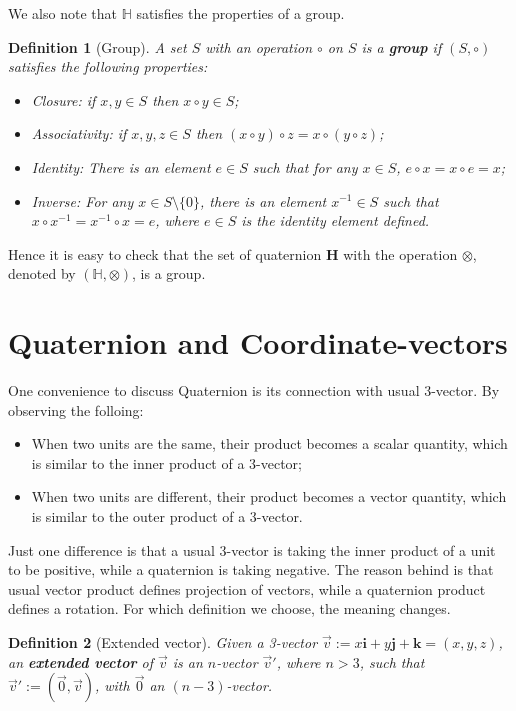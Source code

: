\documentclass[12pt]{article}
\newtheorem*{definition}{Definition}
\begin{document}
    We also note that $\mathbb{H}$ satisfies the properties of a group.

    \begin{definition}[Group]
        A set $S$ with an operation $\circ$ on $S$ is a \textbf{group} if $(S,\circ)$ satisfies the following properties: \begin{itemize}
            \item Closure: if $x,y\in S$ then $x\circ y\in S$;
            \item Associativity: if $x,y,z\in S$ then $(x\circ y)\circ z = x\circ (y\circ z)$;
            \item Identity: There is an element $e\in S$ such that for any $x\in S$, $e\circ x=x\circ e=x$;
            \item Inverse: For any $x\in S\setminus\{0\}$, there is an element $x^{-1}\in S$ such that $x\circ x^{-1}=x^{-1}\circ x= e$, where $e\in S$ is the identity element defined.
        \end{itemize}
    \end{definition}

    Hence it is easy to check that the set of quaternion $\mathbf{H}$ with the operation $\otimes$, denoted by $(\mathbb{H},\otimes)$, is a group.

    \section{Quaternion and Coordinate-vectors}

    One convenience to discuss Quaternion is its connection with usual 3-vector. By observing the folloing: \begin{itemize}
        \item When two units are the same, their product becomes a scalar quantity, which is similar to the inner product of a 3-vector;
        \item When two units are different, their product becomes a vector quantity, which is similar to the outer product of a 3-vector.
    \end{itemize}

    Just one difference is that a usual 3-vector is taking the inner product of a unit to be positive, while a quaternion is taking negative. The reason behind is that usual vector product defines projection of vectors, while a quaternion product defines a rotation. For which definition we choose, the meaning changes.

    \begin{definition}[Extended vector]
        Given a 3-vector $\vec{v}:=x\mathbf{i}+y\mathbf{j}+\mathbf{k}=(x,y,z)$, an \textbf{extended vector} of $\vec{v}$ is an $n$-vector $\vec{v}'$, where $n>3$, such that $\vec{v}':=(\vec{0},\vec{v})$, with $\vec{0}$ an $(n-3)$-vector.
    \end{definition}
\end{document}
